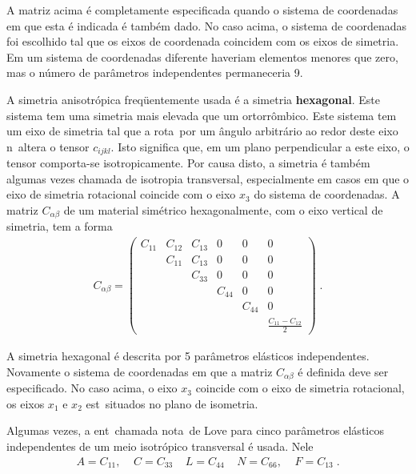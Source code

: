 A matriz acima \'e completamente especificada quando o
sistema de coordenadas em que esta \'e indicada \'e
tamb\'em dado. No caso acima, o sistema de coordenadas foi
escolhido tal que os eixos de coordenada coincidem com os
eixos de simetria. Em um sistema de coordenadas diferente
haveriam elementos menores que zero, mas o n\'umero de
par\^ametros independentes permaneceria 9.

A simetria anisotr\'opica freq\"uentemente usada \'e a
simetria {\bf hexagonal}. Este sistema tem uma simetria
mais elevada que um ortorr\^ombico. Este sistema tem um eixo
de simetria tal que a rota\cao\ por um \^angulo
arbitr\'ario ao redor deste eixo n\ao\ altera o tensor
$c_{ijkl}$. Isto significa que, em um plano perpendicular
a este eixo, o tensor comporta-se isotropicamente. Por
causa disto, a simetria \'e tamb\'em algumas vezes
chamada de isotropia transversal, especialmente em
casos em que o eixo de simetria rotacional coincide com o
eixo $x_3$ do sistema de coordenadas. A matriz
$C_{\alpha \beta}$ de um material sim\'etrico
hexagonalmente, com o eixo vertical de simetria, tem a
forma
\begin{eqnarray}
C_{\alpha \beta} = \left(
\begin{array}{cccccc}
C_{11} & C_{12} & C_{13} & 0      & 0      & 0 \\
       & C_{11} & C_{13} & 0      & 0      & 0 \\
       &        & C_{33} & 0      & 0      & 0 \\
       &        &        & C_{44} & 0      & 0 \\
       &        &        &        & C_{44} & 0 \\
       &        &        & & & \frac{C_{11}-C_{12}}{2}
\end{array} \right) \; .
\end{eqnarray}

A simetria hexagonal \'e descrita por 5 par\^ametros
el\'asticos independentes. Novamente o sistema de
coordenadas em que a matriz $C_{\alpha \beta}$ \'e
definida deve ser especificado. No caso acima, o eixo
$x_3$ coincide com o eixo de simetria rotacional, os
eixos $x_1$ e $x_2$ est\ao\ situados no plano de
isometria.

Algumas vezes, a ent\ao\ chamada nota\cao\ de Love para
cinco par\^ametros el\'asticos independentes de um meio
 isotr\'opico transversal \'e usada. Nele
\begin{eqnarray}
A=C_{11}, \;\;\;\; C=C_{33} \;\;\;\; L=C_{44} \;\;\;\;
N=C_{66}, \;\;\;\; F=C_{13} \; .
\end{eqnarray}

